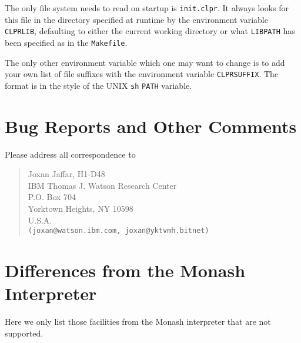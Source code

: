 The only file \CLPR{} system needs to read on startup is {\tt init.clpr}. 
It always looks for this file in the directory specified at runtime by the
environment variable {\tt CLPRLIB}, defaulting to either the current working 
directory or what {\tt LIBPATH} has been specified as in the {\tt Makefile}.

The only other environment variable which one may want to change is to
add your own list of file suffixes with the 
environment variable {\tt CLPRSUFFIX}.
The format is in the style of the UNIX {\tt sh} {\tt PATH} variable.

\chapter{Bug Reports and Other Comments}

Please address all correspondence to

\begin{quote}
Joxan Jaffar, H1-D48 \\
IBM Thomas J. Watson Research Center \\
P.O. Box 704 \\
Yorktown Heights, NY 10598 \\
U.S.A. \\
{\tt (joxan@{watson.ibm.com, joxan@yktvmh.bitnet})}
\end{quote}

\newpage






\appendix
\chapter{Differences from the Monash Interpreter}

Here we only list those facilities from the Monash interpreter that are
not supported.


